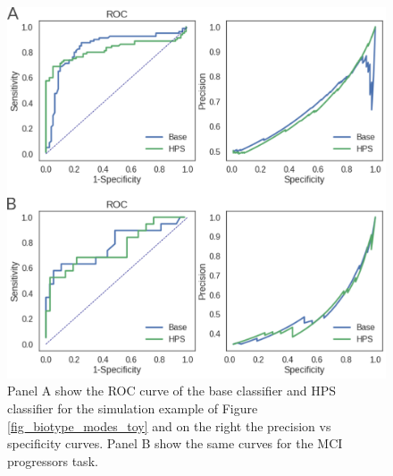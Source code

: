 \documentclass[authoryear]{elsarticle}
\begin{document}
\begin{figure}%
\centering
\includegraphics[width=\linewidth]{figures/roc_ps.png}
\caption{Panel A show the ROC curve of the base classifier and HPS classifier for the simulation example of Figure \ref{fig_biotype_modes_toy} and on the right the precision vs specificity curves. Panel B show the same curves for the MCI progressors task.}
\label{fig_roc_ps}
\end{figure}
\end{document}
